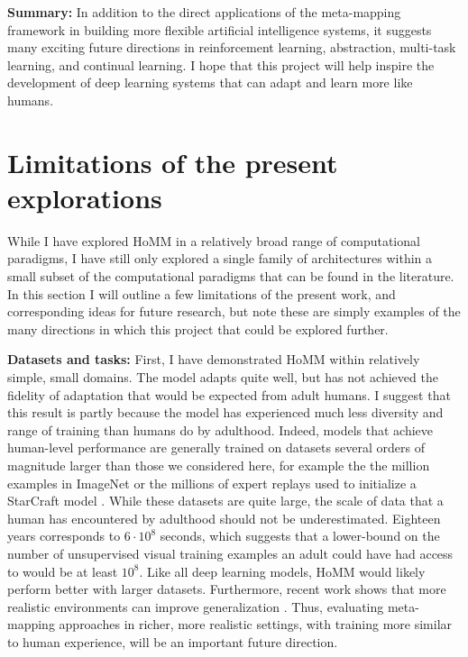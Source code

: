 \textbf{Summary:} In addition to the direct applications of the meta-mapping framework in building more flexible artificial intelligence systems, it suggests many exciting future directions in reinforcement learning, abstraction, multi-task learning, and continual learning. I hope that this project will help inspire the development of deep learning systems that can adapt and learn more like humans. \par 

\section{Limitations of the present explorations}

While I have explored HoMM in a relatively broad range of computational paradigms, I have still only explored a single family of architectures within a small subset of the computational paradigms that can be found in the literature. In this section I will outline a few limitations of the present work, and corresponding ideas for future research, but note these are simply examples of the many directions in which this project that could be explored further. \par

\textbf{Datasets and tasks:} First, I have demonstrated HoMM within relatively simple, small domains. The model adapts quite well, but has not achieved the fidelity of adaptation that would be expected from adult humans. I suggest that this result is partly because the model has experienced much less diversity and range of training than humans do by adulthood. Indeed, models that achieve human-level performance are generally trained on datasets several orders of magnitude larger than those we considered here, for example the the million examples in ImageNet \citep{Deng2009} or the millions of expert replays used to initialize a StarCraft model \citep{Vinyals2019}. While these datasets are quite large, the scale of data that a human has encountered by adulthood should not be underestimated. Eighteen years corresponds to \(6 \cdot 10^8\) seconds, which suggests that a lower-bound on the number of unsupervised visual training examples an adult could have had access to would be at least \(10^8\). Like all deep learning models, HoMM would likely perform better with larger datasets. Furthermore, recent work shows that more realistic environments can improve generalization \citep{Hill2019a}. Thus, evaluating meta-mapping approaches in richer, more realistic settings, with training more similar to human experience, will be an important future direction. \par

